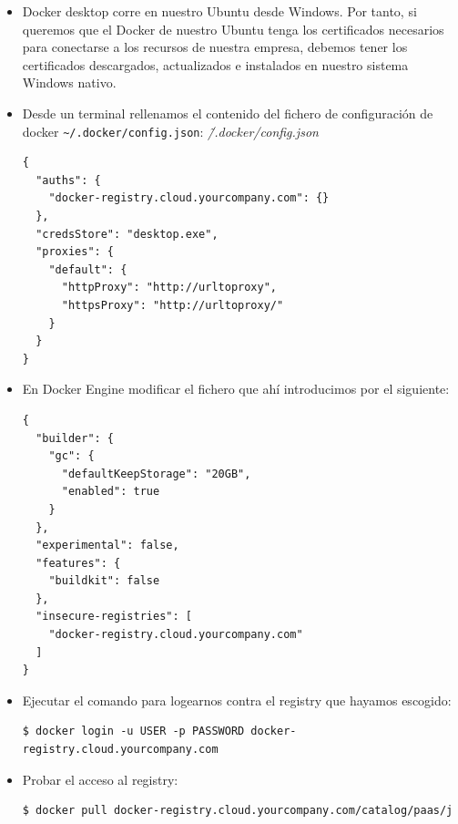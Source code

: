 \documentclass{article}
\newenvironment{codetemplate}[1][]{%
  \mybasecolorbox[#1]
  \itshape
}{%
  \endmybasecolorbox
}
\begin{document}
\begin{itemize}
    \item Docker desktop corre en nuestro Ubuntu desde Windows. Por tanto, si queremos que el Docker de nuestro Ubuntu tenga los certificados necesarios para conectarse a los recursos de nuestra empresa, debemos tener los certificados descargados, actualizados e instalados en nuestro sistema Windows nativo.
    \item Desde un terminal rellenamos el contenido del fichero de configuración de docker \verb|~/.docker/config.json|:
\begin{codetemplate}{\~/.docker/config.json}
\begin{verbatim}
{
  "auths": {
    "docker-registry.cloud.yourcompany.com": {}
  },
  "credsStore": "desktop.exe",
  "proxies": {
    "default": {
      "httpProxy": "http://urltoproxy",
      "httpsProxy": "http://urltoproxy/"
    }
  }
}
\end{verbatim}
\end{codetemplate}

    \item En Docker Engine modificar el fichero que ahí introducimos por el siguiente:
\begin{codetemplate}{}
\begin{verbatim}
{
  "builder": {
    "gc": {
      "defaultKeepStorage": "20GB",
      "enabled": true
    }
  },
  "experimental": false,
  "features": {
    "buildkit": false
  },
  "insecure-registries": [
    "docker-registry.cloud.yourcompany.com"
  ]
}
\end{verbatim}
\end{codetemplate}

    \item Ejecutar el comando para logearnos contra el registry que hayamos escogido:
\begin{codetemplate}{}
\begin{verbatim}
$ docker login -u USER -p PASSWORD docker-registry.cloud.yourcompany.com
\end{verbatim}
\end{codetemplate}

    \item Probar el acceso al registry:
\begin{codetemplate}{}
\begin{verbatim}
$ docker pull docker-registry.cloud.yourcompany.com/catalog/paas/j
\end{verbatim}
\end{codetemplate} 
\end{itemize}
\end{document}

